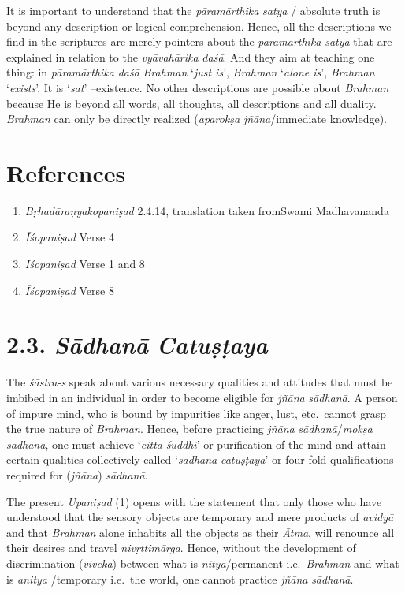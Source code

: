 It is important to understand that the \emph{pāramārthika} \emph{satya} / absolute truth is beyond any description or logical comprehension. Hence, all the descriptions we find in the scriptures are merely pointers about the \emph{pāramārthika} \emph{satya} that are explained in relation to the \emph{vyāvahārika} \emph{daśā}. And they aim at teaching one thing: in \emph{pāramārthika} \emph{daśā} \emph{Brahman} `\emph{just is}', \emph{Brahman} `\emph{alone is}', \emph{Brahman} `\emph{exists}'. It is `\emph{sat}' --existence. No other descriptions are possible about \emph{Brahman} because He is beyond all words, all thoughts, all descriptions and all duality. \emph{Brahman} can only be directly realized (\emph{aparokṣa} \emph{jñāna}/immediate knowledge).

\section*{References}

\begin{enumerate}
\itemsep=0pt
\item
  \emph{Bṛhadāraṇyakopaniṣad} 2.4.14, translation taken from\hfil\break Swami Madhavananda
\item
  \emph{Īśopaniṣad} Verse 4
\item
  \emph{Īśopaniṣad} Verse 1 and 8
\item
  \emph{Īśopaniṣad} Verse 8
\end{enumerate}
\newpage

\section*{2.3. \emph{Sādhanā} \emph{Catuṣṭaya}}

The \emph{śāstra-s} speak about various necessary qualities and attitudes that must be imbibed in an individual in order to become eligible for \emph{jñāna} \emph{sādhanā}. A person of impure mind, who is bound by impurities like anger, lust, etc.\ cannot grasp the true nature of \emph{Brahman}. Hence, before practicing \emph{jñāna} \emph{sādhanā}/\emph{mokṣa} \emph{sādhanā}, one must achieve `\emph{citta} \emph{śuddhi}' or purification of the mind and attain certain qualities collectively called `\emph{sādhanā} \emph{catuṣṭaya}' or four-fold qualifications required for (\emph{jñāna}) \emph{sādhanā}.

The present \emph{Upaniṣad} (1) opens with the statement that only those who have understood that the sensory objects are temporary and mere products of \emph{avidyā} and that \emph{Brahman} alone inhabits all the objects as their \emph{Ātma}, will renounce all their desires and travel \emph{nivṛttimārga}. Hence, without the development of discrimination (\emph{viveka}) between what is \emph{nitya}/permanent i.e.\ \emph{Brahman} and what is \emph{anitya} /temporary i.e.\ the world, one cannot practice \emph{jñāna} \emph{sādhanā}.

